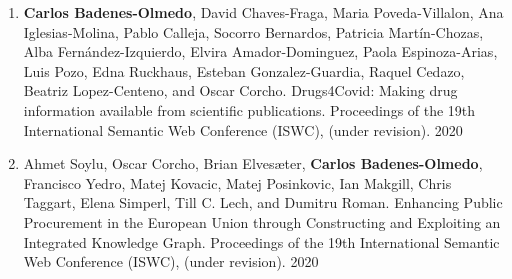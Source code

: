 \begin{enumerate}
\item \textbf{Carlos Badenes-Olmedo}, David Chaves-Fraga, Maria Poveda-Villalon, Ana Iglesias-Molina, Pablo Calleja, Socorro Bernardos, Patricia Martín-Chozas, Alba Fernández-Izquierdo, Elvira Amador-Dominguez, Paola Espinoza-Arias, Luis Pozo, Edna Ruckhaus, Esteban Gonzalez-Guardia, Raquel Cedazo, Beatriz Lopez-Centeno, and Oscar Corcho. Drugs4Covid: Making drug information available from scientific publications. Proceedings of the 19th International Semantic Web Conference (ISWC), (under revision). 2020
\item Ahmet Soylu, Oscar Corcho, Brian Elvesæter, \textbf{Carlos Badenes-Olmedo}, Francisco Yedro, Matej Kovacic, Matej Posinkovic, Ian Makgill, Chris Taggart, Elena Simperl, Till C. Lech, and Dumitru Roman. Enhancing Public Procurement in the European Union through Constructing and Exploiting an Integrated Knowledge Graph. Proceedings of the 19th International Semantic Web Conference (ISWC), (under revision). 2020


\end{enumerate}


